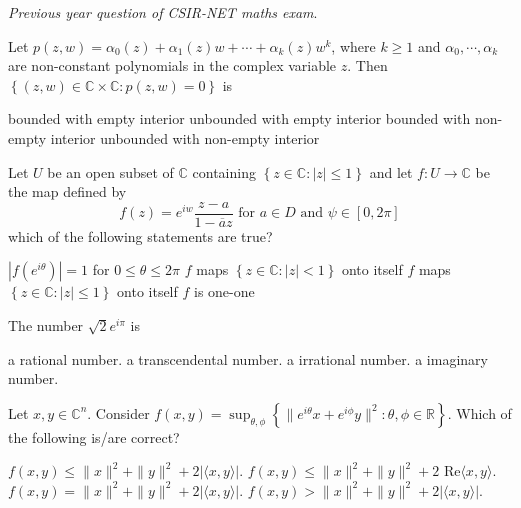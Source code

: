 \documentclass[10pt]{exam}
\newcommand{\R}{\ensuremath{\mathbb{R}}}
\newcommand{\C}{\ensuremath{\mathbb{C}}}
\newcommand{\set}[1]{\ensuremath{\left \{ {#1} \right \}}}
\begin{document}
 
\noindent \emph{Previous year question of CSIR-NET maths exam}. 
\begin{questions}



\question
Let $p(z,w) = \alpha_0(z) + \alpha_1(z)w + \cdots + \alpha_k(z)w^k$, where $k \geq 1$ and $\alpha_0,\cdots, \alpha_k$ are non-constant polynomials in the complex variable $z$. Then 
$ \set{(z,w) \in \C \times \C : p(z,w) = 0}$ is

\begin{choices}
\choice bounded with empty interior 
\choice unbounded with empty interior 
\choice bounded with non-empty interior 
\choice unbounded with non-empty interior 
\end{choices}  

\question
Let $U$ be an open subset of $\C$ containing $\set{z\in \C: |z| \leq 1}$ and let $f:U \rightarrow \C$ be the map defined by 
$$ f(z) = e^{iw}\frac{z-a}{1 - \overline{a}z} \text{ for } a \in D \text { and } \psi \in [0, 2 \pi ]$$
which of the following statements are true?

\begin{checkboxes}
\choice $|f(e^{i \theta })| =1 $ for $0 \leq \theta \leq 2 \pi $ 
\choice $f$ maps $\set{z \in \C: |z| < 1}$ onto itself 
\choice $f$ maps $\set{z \in \C: |z| \leq 1}$ onto itself 
\choice $f$ is one-one
\end{checkboxes}

\question 
The number $\sqrt{2} e^{i\pi}$ is 

\begin{choices}
\choice a rational number.
\choice a transcendental number. 
\choice a irrational number. 
\choice a imaginary  number. 
\end{choices}

\question 
Let $x,y \in \C^n$. Consider $f(x,y) = \sup_{\theta, \phi}\set{\|e^{i\theta} x+ e^{i \phi} y \|^2 : \theta, \phi \in \R}$. Which of the following is/are correct?

\begin{checkboxes}
\choice $f(x,y) \leq \|x\|^2 + \|y\|^2 +2| \langle x,y \rangle |$. 
\choice $f(x,y) \leq \|x\|^2 + \|y\|^2 +2\mbox{ Re}\langle x,y \rangle$. 
\choice $f(x,y)   =  \|x\|^2 + \|y\|^2 +2| \langle x,y \rangle |$. 
\choice $f(x,y)   >  \|x\|^2 + \|y\|^2 +2| \langle x,y \rangle |$. 
\end{checkboxes}


\end{questions}
\end{document}
